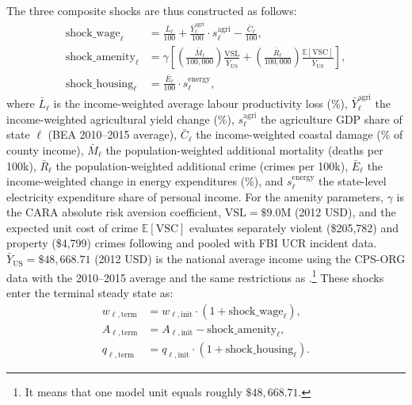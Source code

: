 \documentclass[12pt, a4paper]{article}
\begin{document}
The three composite shocks are thus constructed as follows:
\begin{align}
  \text{shock\_wage}_\ell &= \frac{\bar L_\ell}{100}
    + \frac{\bar Y_\ell^{\text{agri}}}{100} \cdot s_\ell^{\text{agri}}
    - \frac{\bar C_\ell}{100}, \label{eq:shock_wage} \\
  \text{shock\_amenity}_\ell &= \gamma \left[ \left(\frac{\bar M_\ell}{100{,}000}\right) \frac{\text{VSL}}{\bar{Y}_{\text{US}}} + \left(\frac{\bar R_\ell}{100{,}000}\right) \frac{\mathbb{E}[\text{VSC}]}{\bar{Y}_{\text{US}}} \right], \label{eq:shock_amenity} \\
  \text{shock\_housing}_\ell &= \frac{\bar E_\ell}{100} \cdot s_\ell^{\text{energy}}, \label{eq:shock_housing}
\end{align}
where $\bar L_\ell$ is the income-weighted average labour productivity loss (\%), $\bar Y_\ell^{\text{agri}}$ the income-weighted agricultural yield change (\%), $s_\ell^{\text{agri}}$ the agriculture GDP share of state $\ell$ (BEA 2010--2015 average), $\bar C_\ell$ the income-weighted coastal damage (\% of county income), $\bar M_\ell$ the population-weighted additional mortality (deaths per 100k), $\bar R_\ell$ the population-weighted additional crime (crimes per 100k), $\bar E_\ell$ the income-weighted change in energy expenditures (\%), and $s_\ell^{\text{energy}}$ the state-level electricity expenditure share of personal income. For the amenity parameters, $\gamma$ is the CARA absolute risk aversion coefficient, $\text{VSL} = \$9.0\text{M}$ (2012 USD), and the expected unit cost of crime $\mathbb{E}[\text{VSC}]$ evaluates separately violent (\$205,782) and property (\$4,799) crimes following \citet{mccollister_cost_2010} and pooled with FBI UCR incident data. $\bar{Y}_{\text{US}} = \$48,668.71$ (2012 USD) is the national average income using the CPS-ORG data with the 2010--2015 average and the same restrictions as \citet{dvorkin_geography_2025}.\footnote{It means that one model unit equals roughly $\$48,668.71$.} These shocks enter the terminal steady state as:
\begin{align}
  w_{\ell, \text{term}} &= w_{\ell, \text{init}} \cdot (1 + \text{shock\_wage}_\ell), \label{eq:w_terminal}\\
  A_{\ell, \text{term}} &= A_{\ell, \text{init}} - \text{shock\_amenity}_\ell, \label{eq:A_terminal}\\
  q_{\ell, \text{term}} &= q_{\ell, \text{init}} \cdot (1 + \text{shock\_housing}_\ell). \label{eq:q_terminal}
\end{align}
\end{document}
